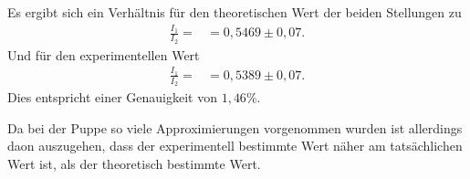 Es ergibt sich ein Verhältnis für den theoretischen Wert der beiden Stellungen zu
\begin{align}
    \frac{I_1}{I_2} = &= 0,5469\pm 0,07.
\end{align}
Und für den experimentellen Wert
\begin{align*}
    \frac{I_1}{I_2} = &= 0,5389\pm 0,07.
\end{align*}
Dies entspricht einer Genauigkeit von $1,46\%$.

Da bei der Puppe so viele Approximierungen vorgenommen wurden ist allerdings daon auszugehen, dass der experimentell bestimmte Wert näher am 
tatsächlichen Wert ist, als der theoretisch bestimmte Wert.